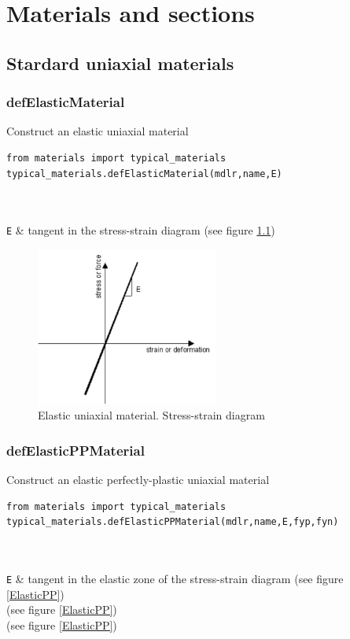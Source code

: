 \chapter{Materials and sections}
\section{Stardard uniaxial materials}
\subsection{defElasticMaterial} 
\noindent Construct an elastic uniaxial material
\begin{verbatim}
from materials import typical_materials
typical_materials.defElasticMaterial(mdlr,name,E)
\end{verbatim}
\begin{paramFuncTable}
\mdlr{} \\
 \\
{\tt E} & tangent in the stress-strain diagram (see figure \ref{Elastic}) \\
\end{paramFuncTable}

\begin{figure}[h]
\centering
\includegraphics[width=60mm]{materials/figures/Elastic}
\caption{Elastic uniaxial material. Stress-strain diagram}\label{Elastic}
\end{figure}

\subsection{defElasticPPMaterial}
\noindent Construct an elastic perfectly-plastic uniaxial material
\begin{verbatim}
from materials import typical_materials
typical_materials.defElasticPPMaterial(mdlr,name,E,fyp,fyn)
\end{verbatim}
\begin{paramFuncTable}
\mdlr{} \\
 \\
{\tt E} & tangent in the elastic zone of the stress-strain diagram (see figure \ref{ElasticPP}) \\
\fyp{} (see figure \ref{ElasticPP}) \\
\fyn{} (see figure \ref{ElasticPP}) \\
\end{paramFuncTable}

